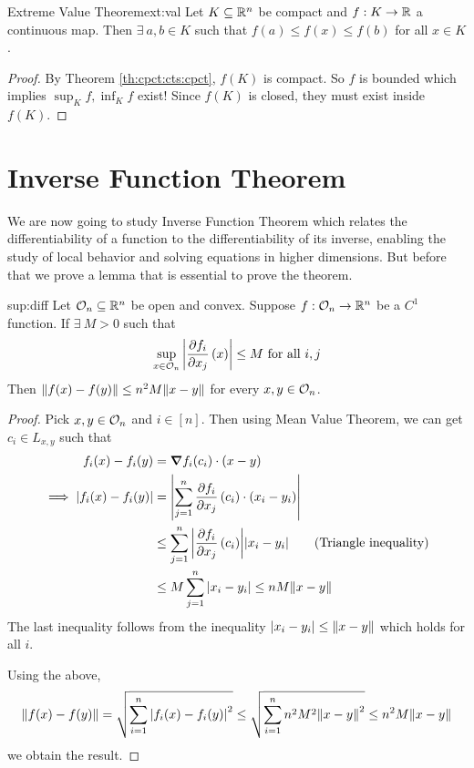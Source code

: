 \documentclass[../Analysis-3.tex]{subfiles}
\begin{document}
\begin{Thm}{Extreme Value Theorem}{ext:val}
  Let $ K \subseteq \mathbb{R}^n $ be compact and $ f:K \to \mathbb{R} $ a continuous map. Then $\exists\ a,b \in K $ such that $ f(a) \leq f(x) \leq f(b) $ for all $ x \in K $.
\end{Thm}

\begin{proof}
  By Theorem \ref{th:cpct:cts:cpct}, $ f(K) $ is compact. So $ f $ is bounded which implies $ \displaystyle \sup_K f, \inf_K f $ exist! Since $ f(K) $ is closed, they must exist inside $ f(K) $.
\end{proof}

\section{Inverse Function Theorem}

We are now going to study Inverse Function Theorem which relates the differentiability of a function to the differentiability of its inverse, enabling the study of local behavior and solving equations in higher dimensions. But before that we prove a lemma that is essential to prove the theorem.

\begin{Lem}{}{sup:diff}
  Let $ \mathcal{O}_{n} \subseteq \mathbb{R}^n $ be open and convex. Suppose $ f:\mathcal{O}_{n} \to \mathbb{R}^n $ be a $ C^1 $ function. If $ \exists\ M > 0 $ such that
  \[ \sup_{x \in \mathcal{O}_{n}} \abs{\pdv{f_i}{x_j}\left( x \right)} \leq M \text{ for all } i, j \]
  Then $ \norm{f(x) - f(y)} \leq n^2 M\norm{x-y} $ for every $ x, y \in \mathcal{O}_{n} $.
\end{Lem}

\begin{proof}
  Pick $ x, y \in \mathcal{O}_{n} $ and $ i \in [n] $. Then using Mean Value Theorem, we can get $ c_i \in L_{x, y} $ such that
  \begin{align*}
    f_i(x) - f_i(y)
     & = \grad f_i (c_i) \cdot (x - y)                                                                     \\
    \implies \abs{f_i(x) - f_i(y)}
     & = \abs{\sum_{j=1}^{n} \pdv{f_i}{x_j}\left( c_i \right) \cdot (x_i - y_i)}                           \\
     & \leq \sum_{j=1}^{n} \abs{\pdv{f_i}{x_j}\left( c_i \right)}\abs{x_i - y_i} \tag{Triangle inequality} \\
     & \leq M \sum_{j=1}^{n} \abs{x_i - y_i} \leq nM \norm{x-y}
  \end{align*}
  The last inequality follows from the inequality $ \abs{x_i-y_i} \leq \norm{x-y} $ which holds for all $ i $.

  Using the above, \[ \norm{f(x) - f(y)} = \sqrt{\sum_{i=1}^{n} \abs{f_i(x) - f_i(y)}^2} \leq \sqrt{\sum_{i=1}^{n} n^2M^2\norm{x-y}^2 } \leq n^2 M\norm{x-y} \]
  we obtain the result.
\end{proof}
\end{document}
